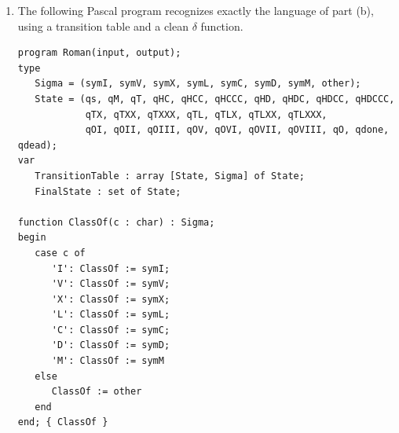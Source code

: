 \documentclass[11pt,openany]{book}
\begin{document}
\begin{enumerate}[{1.}1.]
\begin{enumerate}
\begin{align*}
\delta(q_{TXX},\pmb{X})&=q_{TXXX}, &
\delta(q_{TXX},\pmb{I})&=q_{OI}, &
\delta(q_{TXX},\pmb{V})&=q_{OV},\\[4pt]
\delta(q_{TXXX},\pmb{I})&=q_{OI}, &
\delta(q_{TXXX},\pmb{V})&=q_{OV},\\[4pt]
\delta(q_{TL},\pmb{X})&=q_{TLX}, &
\delta(q_{TL},\pmb{I})&=q_{OI}, &
\delta(q_{TL},\pmb{V})&=q_{OV},\\[4pt]
\delta(q_{TLX},\pmb{X})&=q_{TLXX}, &
\delta(q_{TLX},\pmb{I})&=q_{OI}, &
\delta(q_{TLX},\pmb{V})&=q_{OV},\\[4pt]
\delta(q_{TLXX},\pmb{X})&=q_{TLXXX}, &
\delta(q_{TLXX},\pmb{I})&=q_{OI}, &
\delta(q_{TLXX},\pmb{V})&=q_{OV},\\[4pt]
\delta(q_{TLXXX},\pmb{I})&=q_{OI}, &
\delta(q_{TLXXX},\pmb{V})&=q_{OV},\\[4pt]
\delta(q_O,\pmb{I})&=q_{OI},   & \delta(q_O,\pmb{V})&=q_{OV},\\[4pt]
\delta(q_{OI},\pmb{I})&=q_{OII}, &
\delta(q_{OI},\pmb{V})&=q_{done}, &
\delta(q_{OI},\pmb{X})&=q_{done},\\[4pt]
\delta(q_{OII},\pmb{I})&=q_{OIII},\\[4pt]
\delta(q_{OV},\pmb{I})&=q_{OVI},\qquad
\delta(q_{OVI},\pmb{I})=q_{OVII},\qquad
\delta(q_{OVII},\pmb{I})=q_{OVIII}.
\end{align*}
For every state $q\in S$ and every input letter not covered by the equations above,
\[
\delta(q,\sigma)=q_{dead},
\]
and $q_{dead}$ loops to itself on every input letter. This machine accepts exactly
the standard Roman numerals.

\item The following Pascal program recognizes exactly the language of part (b),
using a transition table and a clean $\delta$ function.

\begin{verbatim}
program Roman(input, output);
type
   Sigma = (symI, symV, symX, symL, symC, symD, symM, other);
   State = (qs, qM, qT, qHC, qHCC, qHCCC, qHD, qHDC, qHDCC, qHDCCC,
            qTX, qTXX, qTXXX, qTL, qTLX, qTLXX, qTLXXX,
            qOI, qOII, qOIII, qOV, qOVI, qOVII, qOVIII, qO, qdone, qdead);
var
   TransitionTable : array [State, Sigma] of State;
   FinalState : set of State;

function ClassOf(c : char) : Sigma;
begin
   case c of
      'I': ClassOf := symI;
      'V': ClassOf := symV;
      'X': ClassOf := symX;
      'L': ClassOf := symL;
      'C': ClassOf := symC;
      'D': ClassOf := symD;
      'M': ClassOf := symM
   else
      ClassOf := other
   end
end; { ClassOf }


\end{verbatim}
\end{enumerate}
\end{enumerate}
\end{document}
